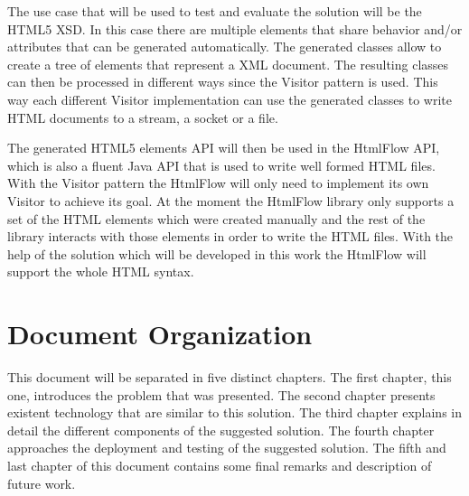The use case that will be used to test and evaluate the solution will be the \ac{HTML}5 \ac{XSD}. In this case there are multiple elements that share behavior and/or attributes that can be generated automatically. The generated classes allow to create a tree of elements that represent a \ac{XML} document. The resulting classes can then be processed in different ways since the Visitor pattern is used. This way each different Visitor implementation can use the generated classes to write HTML documents to a stream, a socket or a file. 

\noindent
The generated \ac{HTML}5 elements \ac{API} will then be used in the HtmlFlow \ac{API}, which is also a fluent Java \ac{API} that is used to write well formed \ac{HTML} files. With the Visitor pattern the HtmlFlow will only need to implement its own Visitor to achieve its goal. At the moment the HtmlFlow library only supports a set of the \ac{HTML} elements which were created manually and the rest of the library interacts with those elements in order to write the \ac{HTML} files. With the help of the solution which will be developed in this work the HtmlFlow will support the whole \ac{HTML} syntax. 

\section{Document Organization}

This document will be separated in five distinct chapters. The first chapter, this one, introduces the problem that was presented. The second chapter presents existent technology that are similar to this solution. The third chapter explains in detail the different components of the suggested solution. The fourth chapter approaches the deployment and testing of the suggested solution. The fifth and last chapter of this document contains some final remarks and description of future work.